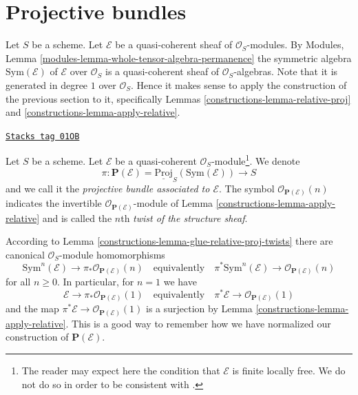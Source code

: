 \section{Projective bundles}
\label{constructions-section-projective-bundle}
Let $S$ be a scheme.
Let $\mathcal{E}$ be a quasi-coherent sheaf of $\mathcal{O}_S$-modules.
By Modules, Lemma \ref{modules-lemma-whole-tensor-algebra-permanence}
the symmetric algebra $\text{Sym}(\mathcal{E})$ of
$\mathcal{E}$ over $\mathcal{O}_S$
is a quasi-coherent sheaf of $\mathcal{O}_S$-algebras.
Note that it is generated in degree $1$ over $\mathcal{O}_S$.
Hence it makes sense to apply the construction of the
previous section to it, specifically Lemmas
\ref{constructions-lemma-relative-proj} and \ref{constructions-lemma-apply-relative}.

\begin{definition}
\label{constructions-definition-projective-bundle}
\href{https://stacks.math.columbia.edu/tag/01OB}{\texttt{Stacks tag 01OB}}

Let $S$ be a scheme. Let $\mathcal{E}$ be a quasi-coherent
$\mathcal{O}_S$-module\footnote{The reader may expect here
the condition that $\mathcal{E}$ is finite locally free. We do not
do so in order to be consistent with
\cite[II, Definition 4.1.1]{EGA}.}.
We denote
$$
\pi :
\mathbf{P}(\mathcal{E}) = \underline{\text{Proj}}_S(\text{Sym}(\mathcal{E}))
\longrightarrow
S
$$
and we call it the {\it projective bundle associated to $\mathcal{E}$}.
The symbol $\mathcal{O}_{\mathbf{P}(\mathcal{E})}(n)$
indicates the invertible $\mathcal{O}_{\mathbf{P}(\mathcal{E})}$-module
of Lemma \ref{constructions-lemma-apply-relative} and is called the $n$th
{\it twist of the structure sheaf}.
\end{definition}

According to Lemma \ref{constructions-lemma-glue-relative-proj-twists} there are
canonical $\mathcal{O}_S$-module homomorphisms
$$
\text{Sym}^n(\mathcal{E})
\longrightarrow
\pi_*\mathcal{O}_{\mathbf{P}(\mathcal{E})}(n)
\quad\text{equivalently}\quad
\pi^*\text{Sym}^n(\mathcal{E})
\longrightarrow
\mathcal{O}_{\mathbf{P}(\mathcal{E})}(n)
$$
for all $n \geq 0$. In particular, for $n = 1$ we have
$$
\mathcal{E}
\longrightarrow
\pi_*\mathcal{O}_{\mathbf{P}(\mathcal{E})}(1)
\quad\text{equivalently}\quad
\pi^*\mathcal{E}
\longrightarrow
\mathcal{O}_{\mathbf{P}(\mathcal{E})}(1)
$$
and the map $\pi^*\mathcal{E} \to \mathcal{O}_{\mathbf{P}(\mathcal{E})}(1)$
is a surjection by Lemma \ref{constructions-lemma-apply-relative}.
This is a good way to remember how we have normalized
our construction of $\mathbf{P}(\mathcal{E})$.

